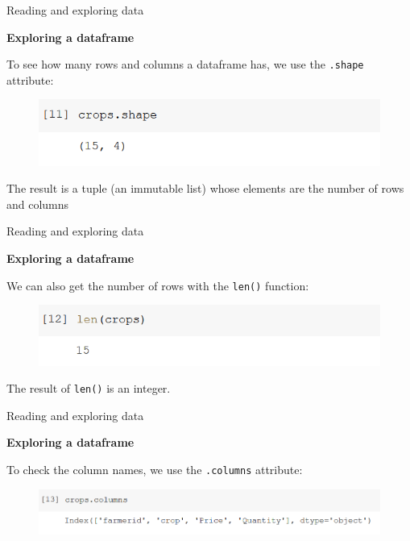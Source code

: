 \documentclass[aspectratio=169]{beamer}
\begin{document}
\begin{frame}{Reading and exploring data}

	\textbf{Exploring a dataframe}

	To see how many rows and columns a dataframe has, we use the \texttt{.shape} attribute:
	
	\begin{figure}
		\includegraphics[width=0.7\linewidth]{img/crops_shape.png}
	\end{figure}

	The result is a tuple (an immutable list) whose elements are the number of rows and columns

\end{frame}

\begin{frame}{Reading and exploring data}

	\textbf{Exploring a dataframe}

	We can also get the number of rows with the \texttt{len()} function:
	
	\begin{figure}
		\includegraphics[width=0.7\linewidth]{img/crops_len.png}
	\end{figure}
	
	The result of \texttt{len()} is an integer.

\end{frame}

\begin{frame}{Reading and exploring data}

	\textbf{Exploring a dataframe}

	To check the column names, we use the \texttt{.columns} attribute:
	
	\begin{figure}
		\includegraphics[width=0.9\linewidth]{img/crops_columns.png}
	\end{figure}

\end{frame}
\end{document}
